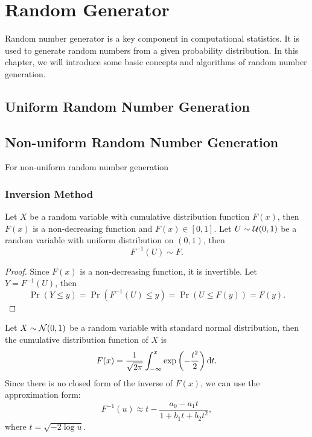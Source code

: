 \chapter{Random Generator}

Random number generator is a key component in computational statistics. It is used to generate random numbers from a given probability distribution. In this chapter, we will introduce some basic concepts and algorithms of random number generation.

\section{Uniform Random Number Generation}

\section{Non-uniform Random Number Generation}

For non-uniform random number generation

\subsection{Inversion Method}

\begin{theorem}
	Let $X$ be a random variable with cumulative distribution function $F(x)$, then $F(x)$ is a non-decreasing function and $F(x)\in[0,1]$. Let $U\sim{\mathcal U}(0,1)$ be a random variable with uniform distribution on $(0,1)$, then
	\begin{equation}
		F^{-1}(U)\sim F.
	\end{equation}
\end{theorem}

\begin{proof}
	Since $F(x)$ is a non-decreasing function, it is invertible. Let $Y=F^{-1}(U)$, then
	\begin{equation*}
		\Pr(Y\leq y)=\Pr(F^{-1}(U)\leq y)=\Pr(U\leq F(y))=F(y).
	\end{equation*}
\end{proof}

\begin{example}
	Let $X\sim{\mathcal N}(0,1)$ be a random variable with standard normal distribution, then the cumulative distribution function of $X$ is
	\begin{equation}
		F(x)=\frac{1}{\sqrt{2\pi}}\int_{-\infty}^{x}\exp\left(-\frac{t^{2}}{2}\right)\mathop{}\!\mathrm{d} t.
	\end{equation}
	Since there is no closed form of the inverse of $F(x)$, we can use the approximation form:
	\begin{equation}
		F^{-1}(u)\approx t-\frac{a_{0}-a_{1}t}{1+b_{1}t+b_{2}t^{2}},
	\end{equation}
	where $t=\sqrt{-2\log u}$. %
\end{example}

